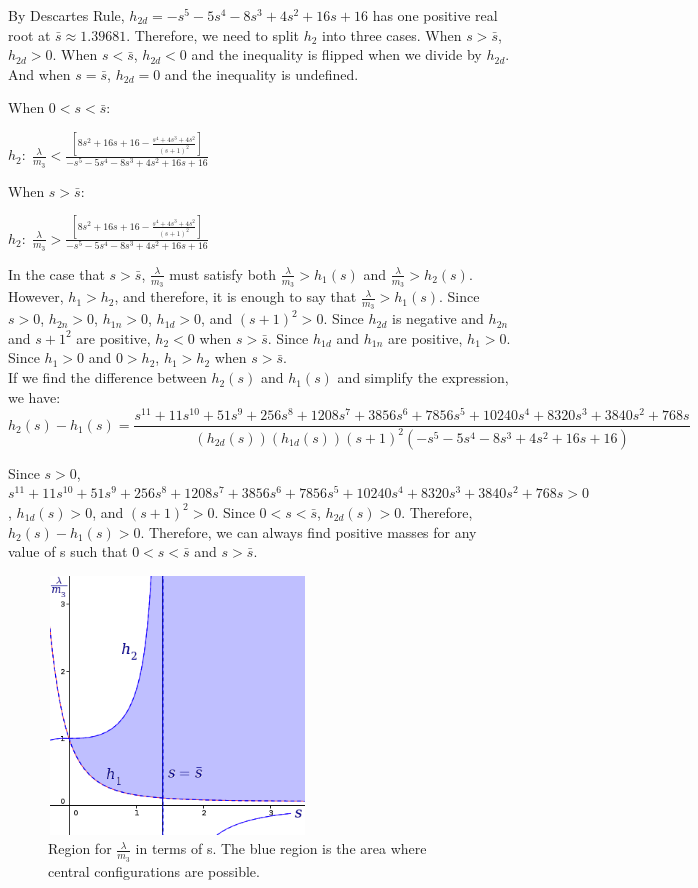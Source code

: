 \documentclass[11pt,leqno]{article}
\theoremstyle{definition}
\theoremstyle{remark}
\numberwithin{equation}{section}
\begin{document}
By Descartes Rule, $h_{2d}=-s^{5}-5s^{4}-8s^{3}+4s^{2}+16s+16$ has one positive real root at $\bar{s}\approx1.39681$. Therefore, we need to split $h_2$ into three cases.  When $s>\bar{s}$, $h_{2d}>0$. When $s<\bar{s}$, $h_{2d}<0$ and the inequality is flipped when we divide by $h_{2d}$. And when $s=\bar{s}$, $h_{2d}=0$ and the inequality is undefined.

When $0<s<\bar{s}$:

$h_{2}:\;\frac{\lambda}{m_{3}}<\frac{[8s^{2}+16s+16-\frac{s^{4}+4s^{3}+4s^{2}}{(s+1)^{2}}]}{-s^{5}-5s^{4}-8s^{3}+4s^{2}+16s+16}$

When $s>\bar{s}$:

$h_{2}:\;\frac{\lambda}{m_{3}}>\frac{[8s^{2}+16s+16-\frac{s^{4}+4s^{3}+4s^{2}}{(s+1)^{2}}]}{-s^{5}-5s^{4}-8s^{3}+4s^{2}+16s+16}$

In the case that $s>\bar{s}$, $\frac{\lambda}{m_3}$ must satisfy both $\frac{\lambda}{m_{3}}>h_{1}(s)$ and $\frac{\lambda}{m_{3}}>h_{2}(s)$. However, $h_{1} > h_2$, and therefore, it is enough to say that $\frac{\lambda}{m_{3}}>h_{1}(s)$. Since $s>0$, $h_{2n} > 0$, $h_{1n} >0$, $h_{1d}>0$, and $(s+1)^2>0$. Since $h_{2d}$ is negative and $h_{2n}$ and ${s+1}^2$ are positive, $h_{2}<0$ when $s>\bar{s}$. Since $h_{1d}$ and $h_{1n}$ are positive, $h_1>0$. Since $h_1>0$ and $0>h_2$, $h_1>h_2$ when $s>\bar{s}$. \\

If we find the difference between $h_{2}(s)$ and $h_{1}(s)$ and simplify the expression, we
have: $$h_{2}(s)-h_{1}(s)=\frac{s^{11}+11s^{10}+51s^{9}+256s^{8}+1208s^{7}+3856s^{6}+7856s^{5}+10240s^{4}+8320s^{3}+3840s^{2}+768s}{(h_{2d}(s))(h_{1d}(s))(s+1)^{2}(-s^{5}-5s^{4}-8s^{3}+4s^{2}+16s+16)}$$

Since $s>0$, $s^{11}+11s^{10}+51s^{9}+256s^{8}+1208s^{7}+3856s^{6}+7856s^{5}+10240s^{4}+8320s^{3}+3840s^{2}+768s>0$,
$h_{1d}(s)>0$, and $(s+1)^{2}>0$. Since $0<s<\bar{s}$, $h_{2d}(s)>0$.
Therefore, $h_{2}(s)-h_{1}(s)>0.$ Therefore, we can always find positive
masses for any value of s such that $0<s<\bar{s}$ and $s>\bar{s}$. 

\begin{center}
\begin{figure}
\includegraphics[width=2.7in, height=2.7in]{Lm3RegionSpecialCase.png}
 \caption{ \label{EL}  Region for $\frac{\lambda}{m_3}$ in terms of s. The blue region is the area where central configurations are possible.  }
\end{figure}
\end{center}
\end{document}
